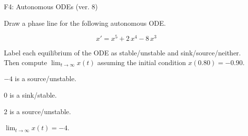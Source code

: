\begin{exercise}
  \begin{exerciseTitle}F4: Autonomous ODEs (ver. 8)\end{exerciseTitle}
  \begin{exerciseStatement}
    

      Draw a phase line for the following 
      autonomous ODE.
    

    
\[x'= x^{5} + 2 \, x^{4} - 8 \, x^{3}\]

    

      Label each equilibrium of the ODE
      as stable/unstable and sink/source/neither.
      Then compute \(\lim_{t\to\infty}x(t)\)
      assuming the initial condition
      \(x( 0.80 )= -0.90\).
    

  \end{exerciseStatement}
  \begin{exerciseAnswer}
    

      \(-4\) is a source/unstable.
      
        \(0\) is a sink/stable.
      
      \(2\) is a source/unstable.
    

    

      \(\lim_{t\to\infty}x(t)=-4\).
    

  \end{exerciseAnswer}
\end{exercise}